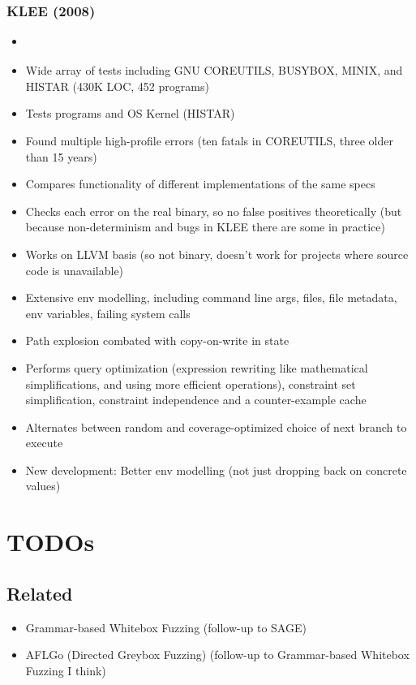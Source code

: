 \documentclass[12pt]{article}
\begin{document}
\subsubsection{KLEE (2008)}
\begin{itemize}
    \item \cite{KLEE}
    \item Wide array of tests including GNU COREUTILS, BUSYBOX, MINIX, and HISTAR (430K LOC, 452 programs)
    \item Tests programs and OS Kernel (HISTAR)
    \item Found multiple high-profile errors (ten fatals in COREUTILS, three older than 15 years)
    \item Compares functionality of different implementations of the same specs
    \item Checks each error on the real binary, so no false positives theoretically (but because non-determinism and bugs in KLEE there are some in practice)
    \item Works on LLVM basis (so not binary, doesn't work for projects where source code is unavailable)
    \item Extensive env modelling, including command line args, files, file metadata, env variables, failing system calls
    \item Path explosion combated with copy-on-write in state
    \item Performs query optimization (expression rewriting like mathematical simplifications, and using more efficient operations), constraint set simplification, constraint independence and a counter-example cache
    \item Alternates between random and coverage-optimized choice of next branch to execute
    \item New development: Better env modelling (not just dropping back on concrete values)
\end{itemize}

\section{TODOs}
\subsection{Related}
\begin{itemize}
    \item Grammar-based Whitebox Fuzzing\cite{GrammarBasedWhiteboxFuzzing} (follow-up to SAGE\cite{SAGE})
    \item AFLGo (Directed Greybox Fuzzing)\cite{AFLGo} (follow-up to Grammar-based Whitebox Fuzzing I think)
\end{itemize}
\end{document}
